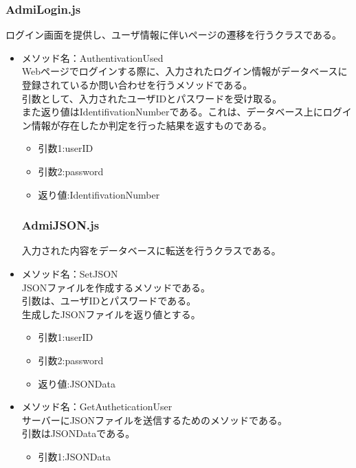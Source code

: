 \documentclass[a4j]{jarticle}
\begin{document}
\subsubsection{AdmiLogin.js}
ログイン画面を提供し、ユーザ情報に伴いページの遷移を行うクラスである。
\begin{itemize}

\item メソッド名：AuthentivationUsed\\

Webページでログインする際に、入力されたログイン情報がデータベースに登録されているか問い合わせを行うメソッドである。\\
引数として、入力されたユーザIDとパスワードを受け取る。\\
また返り値はIdentifivationNumberである。これは、データベース上にログイン情報が存在したか判定を行った結果を返すものである。\\

	\begin{itemize}
		\item 引数1:userID
		\item 引数2:password
		\item 返り値:IdentifivationNumber
	\end{itemize}
	\subsubsection{AdmiJSON.js}
入力された内容をデータベースに転送を行うクラスである。
\item メソッド名：SetJSON\\

JSONファイルを作成するメソッドである。\\引数は、ユーザIDとパスワードである。\\生成したJSONファイルを返り値とする。
	\begin{itemize}
		\item 引数1:userID
		\item 引数2:password
		\item 返り値:JSONData
	\end{itemize}
\item メソッド名：GetAutheticationUser\\

サーバーにJSONファイルを送信するためのメソッドである。\\
引数はJSONDataである。
	\begin{itemize}
		\item 引数1:JSONData
	\end{itemize}
	

\end{itemize}
\end{document}
